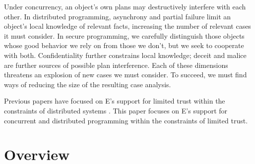 \documentclass{llncs}
\begin{document}
Under concurrency, an object's own plans may destructively interfere
with each other. In distributed programming, asynchrony and partial
failure limit an object's local knowledge of relevant facts,
increasing the number of relevant cases it must consider. In secure
programming, we carefully distinguish those objects whose good
behavior we rely on from those we don't, but we seek to cooperate with
both. Confidentiality further constrains local knowledge; deceit and
malice are further sources of possible plan interference. Each of
these dimensions threatens an explosion of new cases we must
consider. To succeed, we must find ways of reducing the size of the
resulting case analysis.

Previous papers have focused on E's support for limited trust within
the constraints of distributed systems
\cite{miller:ode,miller:myths,miller:paradigm,miller:struct-auth}. This
paper focuses on E's support for concurrent and distributed
programming within the constraints of limited trust.

\section{Overview}
\end{document}
